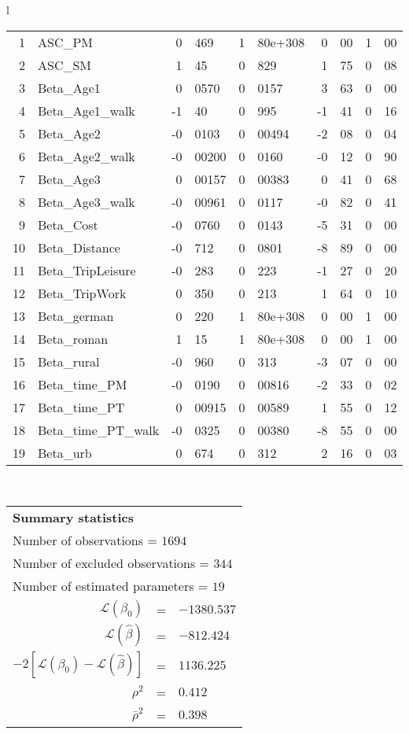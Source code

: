 \begin{tabular}{l}
\begin{tabular}{rlr@{.}lr@{.}lr@{.}lr@{.}l}
1 & ASC_PM  & 0&469 & 1&80e+308 & 0&00 & 1&00\\
2 & ASC_SM & 1&45 & 0&829 & 1&75 & 0&08\\
3 & Beta_Age1 & 0&0570 & 0&0157 & 3&63 & 0&00\\
4 & Beta_Age1_walk & -1&40 & 0&995 & -1&41 & 0&16\\
5 & Beta_Age2 & -0&0103 & 0&00494 & -2&08 & 0&04\\
6 & Beta_Age2_walk & -0&00200 & 0&0160 & -0&12 & 0&90\\
7 & Beta_Age3 & 0&00157 & 0&00383 & 0&41 & 0&68\\
8 & Beta_Age3_walk & -0&00961 & 0&0117 & -0&82 & 0&41\\
9 & Beta_Cost & -0&0760 & 0&0143 & -5&31 & 0&00\\
10 & Beta_Distance & -0&712 & 0&0801 & -8&89 & 0&00\\
11 & Beta_TripLeisure & -0&283 & 0&223 & -1&27 & 0&20\\
12 & Beta_TripWork & 0&350 & 0&213 & 1&64 & 0&10\\
13 & Beta_german & 0&220 & 1&80e+308 & 0&00 & 1&00\\
14 & Beta_roman & 1&15 & 1&80e+308 & 0&00 & 1&00\\
15 & Beta_rural & -0&960 & 0&313 & -3&07 & 0&00\\
16 & Beta_time_PM & -0&0190 & 0&00816 & -2&33 & 0&02\\
17 & Beta_time_PT & 0&00915 & 0&00589 & 1&55 & 0&12\\
18 & Beta_time_PT_walk & -0&0325 & 0&00380 & -8&55 & 0&00\\
19 & Beta_urb & 0&674 & 0&312 & 2&16 & 0&03\\
\hline
\end{tabular}
\\
\begin{tabular}{rcl}
\multicolumn{3}{l}{\bf Summary statistics}\\
\multicolumn{3}{l}{ Number of observations = $1694$} \\
\multicolumn{3}{l}{ Number of excluded observations = $344$} \\
\multicolumn{3}{l}{ Number of estimated  parameters = $19$} \\
 $\mathcal{L}(\beta_0)$ &=&  $-1380.537$ \\
 $\mathcal{L}(\hat{\beta})$ &=& $-812.424 $  \\
 $-2[\mathcal{L}(\beta_0) -\mathcal{L}(\hat{\beta})]$ &=& $1136.225$ \\
    $\rho^2$ &=&   $0.412$ \\
    $\bar{\rho}^2$ &=&    $0.398$ \\
\end{tabular}
  \end{tabular}

